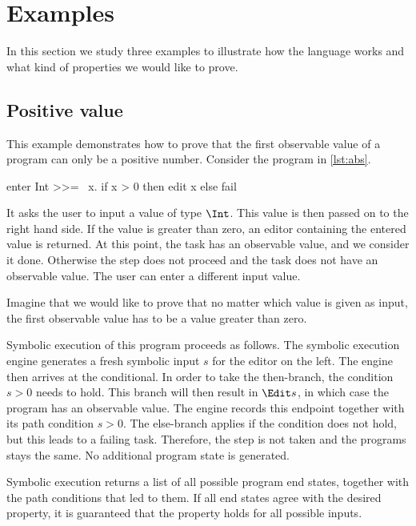 
\section{Examples}
\label{sec:examples}

In this section we study three examples to illustrate how the language \TOPHAT works and what kind of properties we would like to prove.



\subsection{Positive value}

This example demonstrates how to prove that the first observable value of a program can only be a positive number.
Consider the program in \cref{lst:abs}.

\begin{TASK}[float=h
            ,caption=A task that only steps on a positive input value.
            ,label=lst:abs
            ]
  enter Int >>= \ x. if x > 0 then edit x else fail
\end{TASK}

It asks the user to input a value of type $\Int$.
This value is then passed on to the right hand side.
If the value is greater than zero, an editor containing the entered value is returned.
At this point, the task has an observable value, and we consider it done.
Otherwise the step does not proceed and the task does not have an observable value.
The user can enter a different input value.

Imagine that we would like to prove that no matter which value is given as input,
the first observable value has to be a value greater than zero.

Symbolic execution of this program proceeds as follows.
The symbolic execution engine generates a fresh symbolic input $s$ for the editor on the left.
The engine then arrives at the conditional.
In order to take the then-branch, the condition $s > 0$ needs to hold.
This branch will then result in $\Edit s$, in which case the program has an observable value.
The engine records this endpoint together with its path condition $s > 0$.
The else-branch applies if the condition does not hold, but this leads to a failing task.
Therefore, the step is not taken and the programs stays the same.
No additional program state is generated.

Symbolic execution returns a list of all possible program end states, together with the path conditions that led to them.
If all end states agree with the desired property, it is guaranteed that the property holds for all possible inputs.

